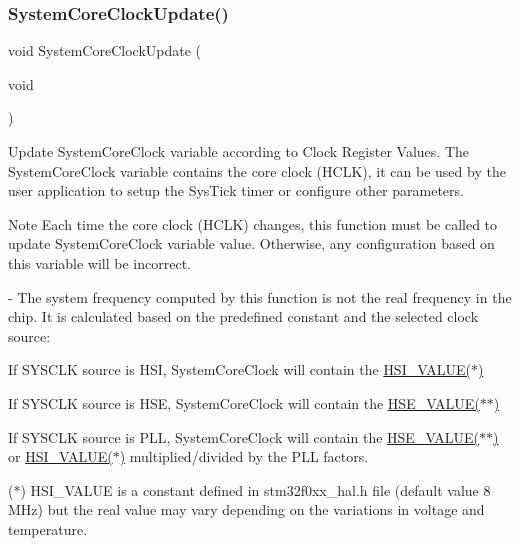 \subsubsection{\texorpdfstring{System\+Core\+Clock\+Update()}{SystemCoreClockUpdate()}}
{\footnotesize\ttfamily void System\+Core\+Clock\+Update (\begin{DoxyParamCaption}\item[{void}]{ }\end{DoxyParamCaption})}



Update System\+Core\+Clock variable according to Clock Register Values. The System\+Core\+Clock variable contains the core clock (H\+C\+LK), it can be used by the user application to setup the Sys\+Tick timer or configure other parameters. 

\begin{DoxyNote}{Note}
Each time the core clock (H\+C\+LK) changes, this function must be called to update System\+Core\+Clock variable value. Otherwise, any configuration based on this variable will be incorrect.

-\/ The system frequency computed by this function is not the real frequency in the chip. It is calculated based on the predefined constant and the selected clock source\+:
\end{DoxyNote}

\begin{DoxyItemize}
\item If S\+Y\+S\+C\+LK source is H\+SI, System\+Core\+Clock will contain the \hyperlink{group___s_t_m32_f0xx___system___private___defines_gaaa8c76e274d0f6dd2cefb5d0b17fbc37}{H\+S\+I\+\_\+\+V\+A\+L\+U\+E($\ast$)}
\item If S\+Y\+S\+C\+LK source is H\+SE, System\+Core\+Clock will contain the \hyperlink{group___s_t_m32_f0xx___system___private___defines_gaeafcff4f57440c60e64812dddd13e7cb}{H\+S\+E\+\_\+\+V\+A\+L\+U\+E($\ast$$\ast$)}
\item If S\+Y\+S\+C\+LK source is P\+LL, System\+Core\+Clock will contain the \hyperlink{group___s_t_m32_f0xx___system___private___defines_gaeafcff4f57440c60e64812dddd13e7cb}{H\+S\+E\+\_\+\+V\+A\+L\+U\+E($\ast$$\ast$)} or \hyperlink{group___s_t_m32_f0xx___system___private___defines_gaaa8c76e274d0f6dd2cefb5d0b17fbc37}{H\+S\+I\+\_\+\+V\+A\+L\+U\+E($\ast$)} multiplied/divided by the P\+LL factors.
\end{DoxyItemize}

($\ast$) H\+S\+I\+\_\+\+V\+A\+L\+UE is a constant defined in stm32f0xx\+\_\+hal.\+h file (default value 8 M\+Hz) but the real value may vary depending on the variations in voltage and temperature.

